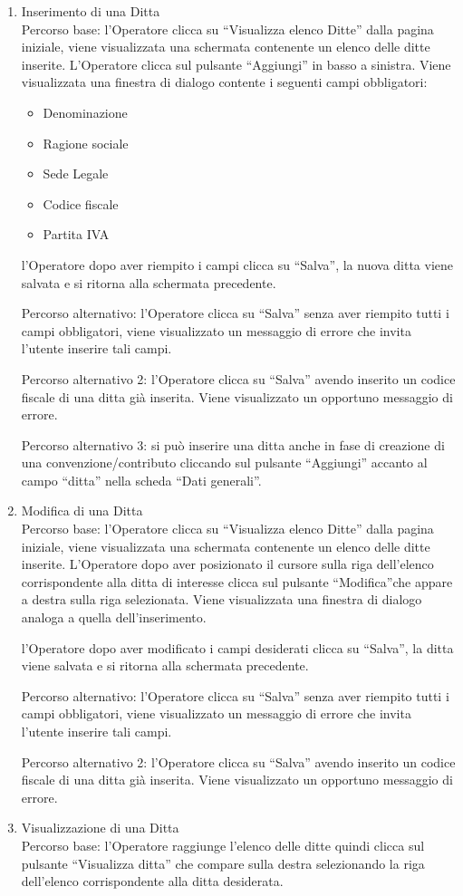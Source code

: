 \begin{enumerate}
\item Inserimento di una Ditta\\
Percorso base:
l'Operatore clicca su ``Visualizza elenco Ditte'' dalla pagina iniziale, viene visualizzata una schermata contenente un elenco delle ditte inserite. L'Operatore clicca sul pulsante ``Aggiungi'' in basso a sinistra. Viene visualizzata
una finestra di dialogo contente i seguenti campi obbligatori:
\begin{itemize}
 \item Denominazione
 \item Ragione sociale
 \item Sede Legale
 \item Codice fiscale
 \item Partita IVA
\end{itemize}
l'Operatore dopo aver riempito i campi clicca su ``Salva'', la nuova ditta viene salvata e si ritorna alla schermata precedente.

Percorso alternativo:
l'Operatore clicca su ``Salva'' senza aver riempito tutti i campi obbligatori, viene visualizzato un messaggio di errore che invita l'utente inserire tali campi.

Percorso alternativo 2:
l'Operatore clicca su ``Salva'' avendo inserito un codice fiscale di una ditta già inserita. Viene visualizzato un opportuno messaggio di errore.

Percorso alternativo 3:
si può inserire una ditta anche in fase di creazione di una convenzione/contributo cliccando sul pulsante ``Aggiungi'' accanto al campo ``ditta'' nella scheda ``Dati generali''.

\item Modifica di una Ditta\\

Percorso base:
l'Operatore clicca su ``Visualizza elenco Ditte'' dalla pagina iniziale, viene visualizzata una schermata contenente un elenco delle ditte inserite. L'Operatore dopo aver posizionato il cursore sulla riga dell'elenco
corrispondente alla ditta di interesse clicca sul pulsante ``Modifica''che appare a destra sulla riga selezionata. Viene visualizzata
una finestra di dialogo analoga a quella dell'inserimento.

l'Operatore dopo aver modificato i campi desiderati clicca su ``Salva'', la  ditta viene salvata e si ritorna alla schermata precedente.

Percorso alternativo:
l'Operatore clicca su ``Salva'' senza aver riempito tutti i campi obbligatori, viene visualizzato un messaggio di errore che invita l'utente inserire tali campi.

Percorso alternativo 2:
l'Operatore clicca su ``Salva'' avendo inserito un codice fiscale di una ditta già inserita. Viene visualizzato un opportuno messaggio di errore.

\item Visualizzazione di una Ditta\\
  Percorso base:
  l'Operatore raggiunge l'elenco delle ditte quindi clicca sul pulsante ``Visualizza ditta'' che compare sulla destra selezionando la riga dell'elenco corrispondente alla ditta desiderata.

\end{enumerate}

